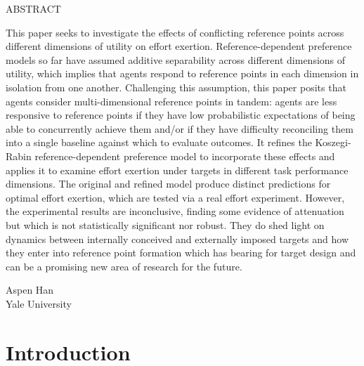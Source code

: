 \documentclass[12pt, letterpaper]{article}
\newcommand{\paperauthor}{Aspen Han}
\newcommand{\paperaffiliation}{Yale University}
\begin{document}
\bigskip

\begin{center}
ABSTRACT
\end{center}

This paper seeks to investigate the effects of conflicting reference points across different dimensions of utility on effort exertion. Reference-dependent preference models so far have assumed additive separability across different dimensions of utility, which implies that agents respond to reference points in each dimension in isolation from one another. Challenging this assumption, this paper posits that agents consider multi-dimensional reference points in tandem: agents are less responsive to reference points if they have low probabilistic expectations of being able to concurrently achieve them and/or if they have difficulty reconciling them into a single baseline against which to evaluate outcomes. It refines the Koszegi-Rabin reference-dependent preference model to incorporate these effects and applies it to examine effort exertion under targets in different task performance dimensions. The original and refined model produce distinct predictions for optimal effort exertion, which are tested via a real effort experiment. However, the experimental results are inconclusive, finding some evidence of attenuation but which is not statistically significant nor robust. They do shed light on dynamics between internally conceived and externally imposed targets and how they enter into reference point formation which has bearing for target design and can be a promising new area of research for the future.

\bigskip\bigskip

\noindent\paperauthor\\
\paperaffiliation

\newpage

\onehalfspacing

\section{Introduction}
\end{document}
